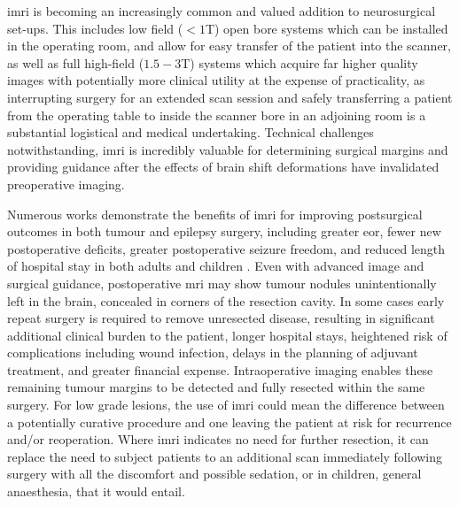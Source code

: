 \Gls{imri} is becoming an increasingly common and valued addition to neurosurgical set-ups.
This includes low field ($<1$T) open bore systems which can be installed in the operating room, and allow for easy transfer of the patient into the scanner\autocite{Steinmeier1998,Senft2010}, as well as full high-field ($1.5-3$T) systems which acquire far higher quality images with potentially more clinical utility\autocite{Makary2011} at the expense of practicality, as interrupting surgery for an extended scan session and safely transferring a patient from the operating table to inside the scanner bore in an adjoining room is a substantial logistical and medical undertaking\autocite{Senft2010,Giordano2016a,Sattur2019}.
Technical challenges notwithstanding, \gls{imri} is incredibly valuable for determining surgical margins and providing guidance after the effects of brain shift deformations have invalidated preoperative imaging.

Numerous works demonstrate the benefits of \gls{imri} for improving postsurgical outcomes in both tumour and epilepsy surgery, including greater \gls{eor}, fewer new postoperative deficits, greater postoperative seizure freedom, and reduced length of hospital stay in both adults and children
\autocite{Shah2012,Zhang2015a,Sacino2016,Rao2017c,Giordano2017,Lu2018a,Garzon-Muvdi2019,Leroy2019,Karsy2019,Golub2020,Hlavac2020,Englman2021}.
Even with advanced image and surgical guidance, postoperative \gls{mri} may show tumour nodules unintentionally left in the brain, concealed in corners of the resection cavity.
In some cases early repeat surgery is required to remove unresected disease, resulting in significant additional clinical burden to the patient, longer hospital stays, heightened risk of complications including wound infection\autocite{Tenney1985,Chang2003}, delays in the planning of adjuvant treatment, and greater financial expense\autocite{Shah2012}.
Intraoperative imaging enables these remaining tumour margins to be detected and fully resected within the same surgery\autocite{Sattur2019,Hlavac2020}.
For low grade lesions, the use of \gls{imri} could mean the difference between a potentially curative procedure and one leaving the patient at risk for recurrence and/or reoperation\autocite{Shah2012}.
Where \gls{imri} indicates no need for further resection, it can replace the need to subject patients to an additional scan immediately following surgery with all the discomfort and possible sedation, or in children, general anaesthesia, that it would entail.

